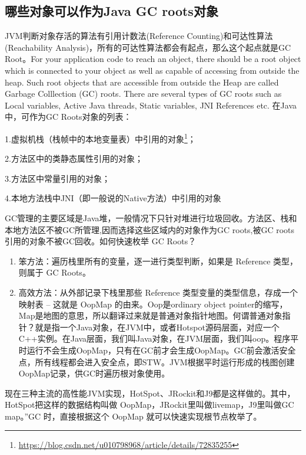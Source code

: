 \documentclass[../../../interview-questions.tex]{subfiles}
\begin{document}
\subsection{哪些对象可以作为Java GC roots对象}

JVM判断对象存活的算法有引用计数法(Reference Counting)和可达性算法(Reachability Analysis)，所有的可达性算法都会有起点，那么这个起点就是GC Root。For your application code to reach an object, there should be a root object which is connected to your object as well as capable of accessing from outside the heap. Such root objects that are accessible from outside the Heap are called Garbage Colllection (GC) roots. There are several types of GC roots such as Local variables, Active Java threads, Static variables, JNI References etc. 在Java中，可作为GC Roots对象的列表：

1.虚拟机栈（栈帧中的本地变量表）中引用的对象\footnote{\url{https://blog.csdn.net/u010798968/article/details/72835255}}；

2.方法区中的类静态属性引用的对象；

3.方法区中常量引用的对象；

4.本地方法栈中JNI（即一般说的Native方法）中引用的对象

GC管理的主要区域是Java堆，一般情况下只针对堆进行垃圾回收。方法区、栈和本地方法区不被GC所管理,因而选择这些区域内的对象作为GC roots,被GC roots引用的对象不被GC回收。如何快速枚举 GC Roots？

\begin{enumerate}
    \item {笨方法：遍历栈里所有的变量，逐一进行类型判断，如果是 Reference 类型，则属于 GC Roots。}
    \item {高效方法：从外部记录下栈里那些 Reference 类型变量的类型信息，存成一个映射表 -- 这就是 OopMap 的由来。Oop是ordinary object pointer的缩写，Map是地图的意思，所以翻译过来就是普通对象指针地图。何谓普通对象指针？就是指一个Java对象，在JVM中，或者Hotspot源码层面，对应一个C++实例。在Java层面，我们叫Java对象，在JVM层面，我们叫oop。程序平时运行不会生成OopMap，只有在GC前才会生成OopMap。GC前会激活安全点，所有线程都会进入安全点，即STW。JVM根据平时运行形成的栈图创建OopMap记录，供GC时遍历根对象使用。}
\end{enumerate}

现在三种主流的高性能JVM实现，HotSpot、JRockit和J9都是这样做的。其中，HotSpot把这样的数据结构叫做 OopMap，JRockit里叫做livemap，J9里叫做GC map。”GC 时，直接根据这个 OopMap 就可以快速实现根节点枚举了。
\end{document}

